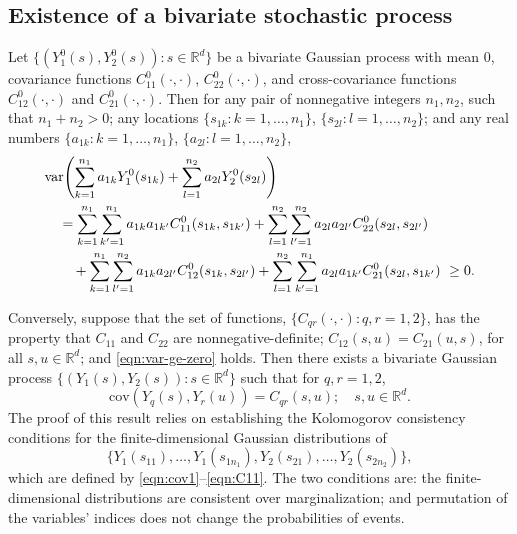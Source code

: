 \documentclass[lineno]{biometrika}
\newcommand{\s}{s}
\renewcommand{\u}{u}
\newcommand{\bzero}{0}
\newcommand{\cov}{\mathrm{cov}}
\newcommand{\var}{\mathrm{var}}
\newcommand{\RR}{\mathbb{R}}
\let\originalleft\left
\let\originalright\right
\renewcommand{\left}{\mathopen{}\mathclose\bgroup\originalleft}
\renewcommand{\right}{\aftergroup\egroup\originalright}
\begin{document}

\subsection{Existence of a bivariate stochastic process}\label{sec:3-1}

Let $\{(Y_1^0(\s),Y_2^0(\s)):\s\in \mathbb{R}^d\}$ be a bivariate Gaussian process with mean $\bzero$, covariance functions $C_{11}^0(\cdot,\cdot)$, $C_{22}^0(\cdot,\cdot)$, and cross-covariance functions $C_{12}^0(\cdot,\cdot)$ and $C_{21}^0(\cdot,\cdot)$. Then for any pair of nonnegative integers $n_1,n_2$, such that $n_1 + n_2 > 0$; any locations $\{\s_{1k}:k=1,\ldots,n_1\}$, $\{\s_{2l}:l=1,\ldots,n_2\}$; and any real numbers $\{a_{1k}:k=1,\ldots,n_1\}$, $\{a_{2l}:l=1,\ldots,n_2\}$,
\begin{align}
  &\var\left(\sum_{k=1}^{n_1}{a_{1k}Y_1^0(\s_{1k})}+\sum_{l=1}^{n_2}{a_{2l}Y_2^0(\s_{2l})}\right)\nonumber \\
  &\quad=\sum_{k=1}^{n_1}\sum_{k'=1}^{n_1} a_{1k}a_{1k'}C_{11}^0(\s_{1k},\s_{1k'})+\sum_{l=1}^{n_2}\sum_{l'=1}^{n_2} a_{2l}a_{2l'}C_{22}^0(\s_{2l},\s_{2l'}) \nonumber\\
  &\qquad+\sum_{k=1}^{n_1}\sum_{l'=1}^{n_2} a_{1k}a_{2l'}C_{12}^0(\s_{1k},\s_{2l'})+\sum_{l=1}^{n_2}\sum_{k'=1}^{n_1} a_{2l}a_{1k'}C_{21}^0(\s_{2l},\s_{1k'})~ \ge 0.\label{eqn:var-ge-zero}
\end{align}

Conversely, suppose that the set of functions, $\{C_{qr}(\cdot,\cdot):q,r=1,2\}$, has the property that $C_{11}$ and $C_{22}$ are nonnegative-definite; $C_{12}(\s,\u)=C_{21}(\u,\s)$, for all $\s,\u\in \mathbb{R}^d$; and \eqref{eqn:var-ge-zero} holds. Then there exists a bivariate Gaussian process $\{(Y_1(\s),Y_2(\s)):\s\in \RR^d\}$ such that for $q,r=1,2$,
\begin{equation*}
\cov(Y_q(\s),Y_r(\u))= C_{qr}(\s,\u);\quad \s,\u\in \RR^d.
\end{equation*}
The proof of this result relies on establishing the Kolomogorov consistency conditions \citep[e.g.,][pp.~482--484]{Billingsley1995} for the finite-dimensional Gaussian distributions of
\begin{equation*}
\{Y_1(\s_{11}),\ldots,Y_1(\s_{1n_1}),Y_2(\s_{21}),\ldots,Y_2(\s_{2n_2})\},
\end{equation*}
which are defined by \eqref{eqn:cov1}--\eqref{eqn:C11}. The two conditions are: the finite-dimensional distributions are consistent over marginalization; and permutation of the variables' indices does not change the probabilities of events.
\end{document}
